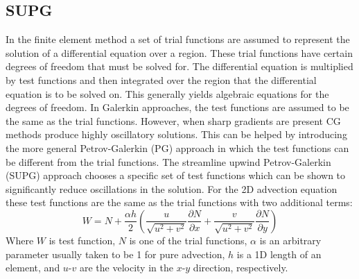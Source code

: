 \subsection{SUPG}
\label{SUPG}
In the finite element method a set of trial functions are assumed to represent the solution of a differential equation over a region. These trial functions have certain degrees of freedom that must be solved for. The differential equation is multiplied by test functions and then integrated over the region that the differential equation is to be solved on. This generally yields algebraic equations for the degrees of freedom. 
In Galerkin approaches, the test functions are assumed to be the same as the trial functions. However, when sharp gradients are present CG methods produce highly oscillatory solutions. This can be helped by introducing the more general Petrov-Galerkin (PG) approach in which the test functions can be different from the trial functions. The streamline upwind Petrov-Galerkin (SUPG) approach chooses a specific set of test functions which can be shown to significantly reduce oscillations in the solution. For the 2D advection equation these test functions are the same as the trial functions with two additional terms:
\begin{equation}
W = N + \frac{\alpha h}{2}\left(\frac{u}{\sqrt{u^2+v^2}}\frac{\partial N}{\partial x} + \frac{v}{\sqrt{u^2+v^2}}\frac{\partial N}{\partial y}\right)
\end{equation}
Where $W$ is test function, $N$ is one of the trial functions, $\alpha$ is an arbitrary parameter usually taken to be 1 for pure advection, $h$ is a 1D length of an element, and $u$-$v$ are the velocity in the $x$-$y$ direction, respectively.
